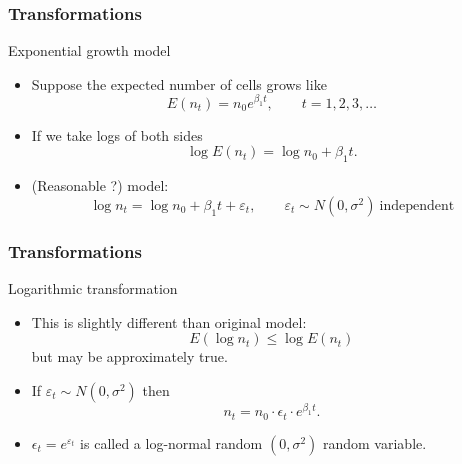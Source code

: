 \documentclass[handout]{beamer}
\begin{document}

   \begin{frame} \frametitle{Transformations}

   \begin{block}
   {Exponential growth model}
   \begin{itemize}
   \item Suppose the expected
   number of cells grows like
   $$
   E(n_t) = n_0 e^{\beta_1t}, \qquad t=1, 2, 3, \dots
   $$

   \item If we take logs of both sides
   $$
   \log E(n_t) = \log n_0 + \beta_1 t.$$

   \item (Reasonable ?) model:
   $$
   \log n_t = \log n_0 + \beta_1 t + \varepsilon_t, \qquad \varepsilon_t \sim N(0,\sigma^2) \ \text{independent}$$
   \end{itemize}
   \end{block}
   \end{frame}


   \begin{frame} \frametitle{Transformations}

   \begin{block}{Logarithmic transformation}
   \begin{itemize}

   \item This is slightly different than original model:
   $$
   E(\log n_t) \leq \log E(n_t)$$
   but may be approximately true.

   \item If $\varepsilon_t \sim N(0,\sigma^2)$ then
   $$
   n_t = n_0 \cdot \epsilon_t \cdot e^{\beta_1 t}.$$
   \item $\epsilon_t=e^{\varepsilon_t}$ is called a log-normal random $(0,\sigma^2)$ random variable.
   \end{itemize}
   \end{block}
   \end{frame}

\end{document}
